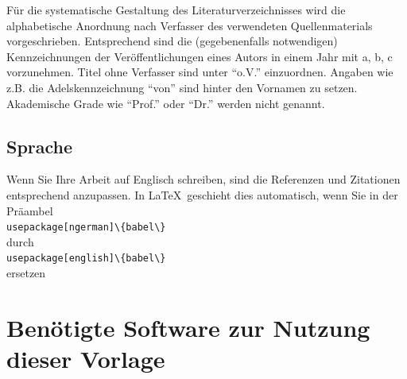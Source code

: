 \documentclass[a4paper,12pt]{scrartcl} %
\begin{document}
Für die systematische Gestaltung des Literaturverzeichnisses wird die alphabetische Anordnung nach Verfasser des verwendeten Quellenmaterials vorgeschrieben. Entsprechend sind die (gegebenenfalls notwendigen) Kennzeichnungen der Veröffentlichungen eines Autors in einem Jahr mit a, b, c vorzunehmen. Titel ohne Verfasser sind unter ``o.V.'' einzuordnen. Angaben wie z.B. die Adelskennzeichnung ``von'' sind hinter den Vornamen zu setzen. Akademische Grade wie ``Prof.'' oder ``Dr.'' werden nicht genannt.

\subsection{Sprache}
Wenn Sie Ihre Arbeit auf Englisch schreiben, sind die Referenzen und Zitationen entsprechend anzupassen. In \LaTeX\ geschieht dies automatisch, wenn Sie in der Präambel\\
\verb|usepackage[ngerman]\{babel\}|\\
durch\\
\verb|usepackage[english]\{babel\}|\\
ersetzen

\section{Benötigte Software zur Nutzung dieser Vorlage}\label{sec:Latex}
\end{document}
